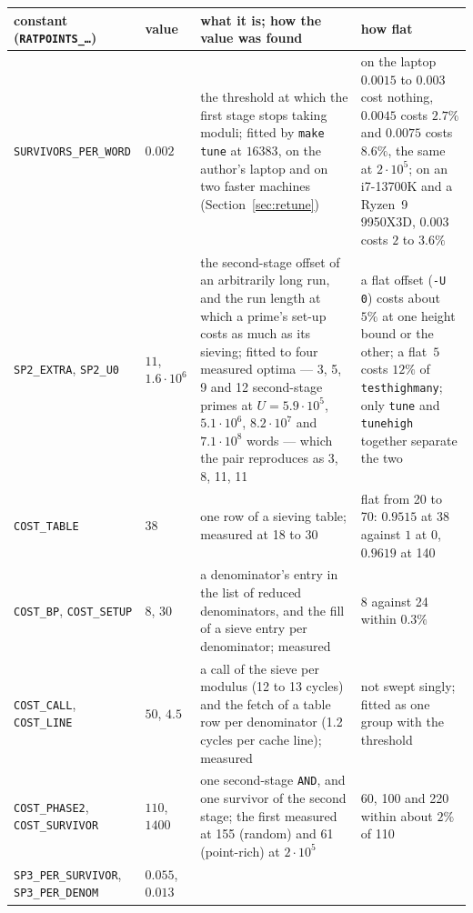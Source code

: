 \documentclass[12pt,a4paper,oneside]{amsart}
\begin{document}
\begin{table}[tbp]\footnotesize\setlength{\tabcolsep}{3pt}%
\renewcommand{\arraystretch}{1.1}
\begin{tabular}{@{}P{4.0cm}P{1.7cm}P{5.6cm}P{5.6cm}@{}}
constant (\texttt{RATPOINTS\_\dots}) & value & what it is; how the value was found & how flat \\
\hline
\texttt{SURVIVORS\_PER\_WORD} & $0.002$ &
  the threshold at which the first stage stops taking moduli; fitted by
  \texttt{make tune} at $16383$, on the author's laptop and on two faster
  machines (Section~\ref{sec:retune}) &
  on the laptop $0.0015$ to $0.003$ cost nothing, $0.0045$ costs $2.7\%$
  and $0.0075$ costs $8.6\%$, the same at $2\cdot10^5$; on an i7-13700K
  and a Ryzen~9 9950X3D, $0.003$ costs $2$ to $3.6\%$ \\[3pt]
\texttt{SP2\_EXTRA}, \texttt{SP2\_U0} & $11$, $1.6\cdot10^6$ &
  the second-stage offset of an arbitrarily long run, and the run length at
  which a prime's set-up costs as much as its sieving; fitted to four
  measured optima --- 3, 5, 9 and 12 second-stage primes at $U =
  5.9\cdot10^5$, $5.1\cdot10^6$, $8.2\cdot10^7$ and $7.1\cdot10^8$ words ---
  which the pair reproduces as 3, 8, 11, 11 &
  a flat offset (\verb+-U 0+) costs about $5\%$ at one height bound or the
  other; a flat~$5$ costs $12\%$ of \texttt{testhighmany}; only
  \texttt{tune} and \texttt{tunehigh} together separate the two \\[3pt]
\texttt{COST\_TABLE} & $38$ &
  one row of a sieving table; measured at 18 to 30 &
  flat from 20 to 70: $0.9515$ at 38 against $1$ at 0, $0.9619$ at 140 \\[3pt]
\texttt{COST\_BP}, \texttt{COST\_SETUP} & $8$, $30$ &
  a denominator's entry in the list of reduced denominators, and the fill
  of a sieve entry per denominator; measured &
  8 against 24 within $0.3\%$ \\[3pt]
\texttt{COST\_CALL}, \texttt{COST\_LINE} & $50$, $4.5$ &
  a call of the sieve per modulus (12 to 13 cycles) and the fetch of a table
  row per denominator (1.2 cycles per cache line); measured &
  not swept singly; fitted as one group with the threshold \\[3pt]
\texttt{COST\_PHASE2}, \texttt{COST\_SURVIVOR} & $110$, $1400$ &
  one second-stage \texttt{AND}, and one survivor of the second stage; the
  first measured at 155 (random) and 61 (point-rich) at $2\cdot10^5$ &
  60, 100 and 220 within about $2\%$ of 110 \\[3pt]
\texttt{SP3\_PER\_SURVIVOR}, \texttt{SP3\_PER\_DENOM} & $0.055$, $0.013$ &

\end{tabular}
\end{table}
\end{document}
